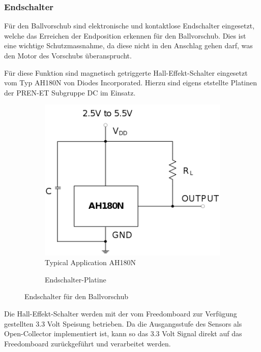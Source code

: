 \subsubsection{Endschalter}
Für den Ballvorschub sind elektronische und kontaktlose Endschalter
eingesetzt, welche das Erreichen der Endposition erkennen für den
Ballvorschub. Dies ist eine wichtige Schutzmassnahme, da diese
nicht in den Anschlag gehen darf, was den Motor des Vorschubs
überansprucht.

Für diese Funktion sind magnetisch getriggerte Hall-Effekt-Schalter
eingesetzt vom Typ AH180N von Diodes Incorporated. Hierzu sind eigens
etstellte Platinen der PREN-ET Subgruppe DC im Einsatz.

\begin{figure}[h!]
	\centering
	\begin{subfigure}[b]{0.45\textwidth}
		\centering
		\includegraphics[width=1\textwidth]{../../fig/et/ah180n.png}
		\caption{Typical Application AH180N}
	\end{subfigure}
	\begin{subfigure}[b]{0.45\textwidth}
		\centering
		\caption{Endschalter-Platine}
	\end{subfigure}
	\caption{Endschalter für den Ballvorschub}
\end{figure}

Die Hall-Effekt-Schalter werden mit der vom Freedomboard zur Verfügung
gestellten 3.3 Volt Speisung betrieben. Da die Ausgangsstufe des Sensors
als Open-Collector implementiert ist, kann so das 3.3 Volt Signal direkt
auf das Freedomboard zurückgeführt und verarbeitet werden. 

